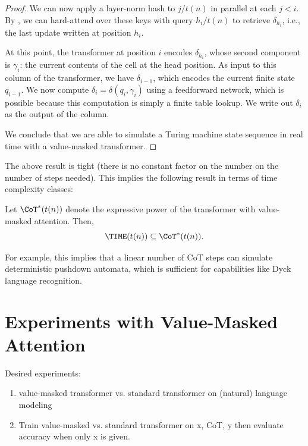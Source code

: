 \begin{proof}
    We can now apply a layer-norm hash to $j/t(n)$ in parallel at each $j < i$. By , we can hard-attend over these keys with query $h_i/t(n)$ to retrieve $\delta_{h_i}$, i.e., the last update written at position $h_i$.

    At this point, the transformer at position $i$ encodes $\delta_{h_i}$, whose second component is $\gamma_i$: the current contents of the cell at the head position. As input to this column of the transformer, we have $\delta_{i - 1}$, which encodes the current finite state $q_{i-1}$. We now compute $\delta_i = \delta(q_i, \gamma_i)$ using a feedforward network, which is possible because this computation is simply a finite table lookup. We write out $\delta_i$ as the output of the column.

    We conclude that we are able to simulate a Turing machine state sequence in real time with a value-masked transformer.
\end{proof}

The above result is tight (there is no constant factor on the number on the number of steps needed). This implies the following result in terms of time complexity classes:

\begin{corollary}
    Let $\CoT^*(t(n))$ denote the expressive power of the transformer with value-masked attention. Then,
    \begin{equation*}
        \TIME(t(n)) \subseteq \CoT^*(t(n)) .
    \end{equation*}
\end{corollary}

For example, this implies that a linear number of CoT steps can simulate deterministic pushdown automata, which is sufficient for capabilities like Dyck language recognition.

\section{Experiments with Value-Masked Attention}

Desired experiments:
\begin{enumerate}
    \item value-masked transformer vs. standard transformer on (natural) language modeling
    \item Train value-masked vs. standard transformer on x, CoT, y then evaluate accuracy when only x is given.
\end{enumerate}

